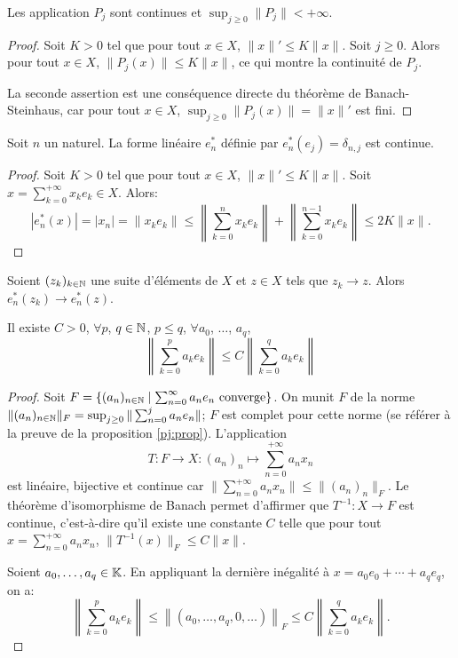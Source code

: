 \begin{cor}
  Les application $P_j$ sont continues et $\sup_{j\geq 0}\|P_j\| < +\infty$.
\end{cor}
\begin{proof}
  Soit $K > 0$ tel que pour tout $x\in X$, $\|x\|'\leq K\|x\|$.
  Soit $j\geq 0$. Alors pour tout $x\in X$, $\|P_j(x)\|\leq K\|x\|$, ce qui
  montre la continuité de $P_j$.

  La seconde assertion est une conséquence directe du théorème de
  Banach-Steinhaus, car pour tout $x\in X$, $\sup_{j\geq 0}\|P_j(x)\|=\|x\|'$
  est fini.
\end{proof}
\begin{prop}
  Soit $n$ un naturel. La forme linéaire $e^*_n$ définie par
  $e^*_n(e_j) = \delta_{n, j}$ est continue.
\end{prop}
\begin{proof}
  Soit $K > 0$ tel que pour tout $x\in X$, $\|x\|'\leq K\|x\|$.
  Soit $x=\sum_{k=0}^{+\infty}x_ke_k\in X$. Alors:
  $$|e^*_n(x)| = |x_n| = \|x_ke_k\| \leq \left\|\sum_{k=0}^{n}x_ke_k\right\|
  + \left\|\sum_{k=0}^{n-1}x_ke_k\right\|\leq 2K\|x\|.$$
\end{proof}
\begin{cor}
  Soient $(z_k)_{k\in\mathbb{N}}$ une suite d'éléments de $X$ et $z\in X$ tels que
  $z_k\to z$. Alors $e^*_n(z_k)\to e^*_n(z)$.
\end{cor}

\begin{prop}
  Il existe $C > 0$, $\forall p$, $q\in\mathbb{N}$, $p\leq q$,
  $\forall a_0$, $\ldots$, $a_q$,
  $$\left\| \sum_{k=0}^p a_ke_k\right\| \leq
  C \left\| \sum_{k=0}^q a_ke_k\right\|$$
\end{prop}

\begin{proof}
  Soit $F = \{(a_n)_{n\in\mathbb{N}}\mid \sum_{n=0}^\infty a_ne_n \mbox{ converge}\}$.
  On munit $F$ de la norme $\|(a_n)_{n\in\mathbb{N}}\|_F =
  \sup_{j\geq 0}\|\sum_{n=0}^j a_ne_n\|$; $F$ est complet pour cette norme
  (se référer à la preuve de la proposition \ref{pj:prop}).
  L'application
  $$T:F\to X: (a_n)_n\mapsto\sum_{n=0}^{+\infty}a_nx_n$$
  est linéaire, bijective et continue car $\|\sum_{n=0}^{+\infty}a_nx_n\|\leq
  \|(a_n)_n\|_F$. Le théorème d'isomorphisme de Banach permet d'affirmer
  que $T^{-1}: X\to F$ est continue, c'est-à-dire qu'il existe une constante
  $C$ telle que pour tout $x= \sum_{n=0}^{+\infty}a_nx_n$, $\|T^{-1}(x)\|_F
  \leq C \|x\|$.

  Soient $a_0, \ldots, a_q\in\mathbb{K}$. En appliquant la dernière inégalité à
  $x = a_0e_0 + \cdots + a_qe_q$, on a:
  $$\left\| \sum_{k=0}^p a_ke_k \right\| \leq
  \left\| (a_0, \ldots, a_q, 0, \ldots) \right\|_F \leq
  C \left\| \sum_{k=0}^q a_ke_k \right\|.$$
\end{proof}
